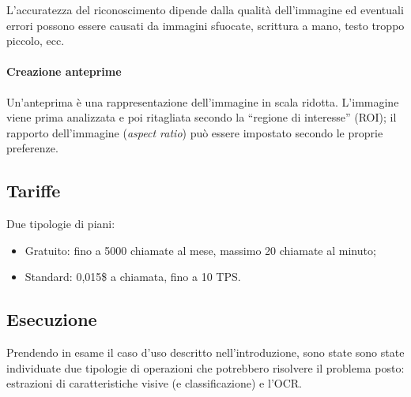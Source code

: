 \documentclass[fleqn,a4paper,11pt]{report}
\begin{document}
L'accuratezza del riconoscimento dipende dalla qualità dell'immagine ed eventuali errori possono essere causati da immagini sfuocate, scrittura a mano, testo troppo piccolo, ecc.
   
\paragraph{Creazione anteprime} Un'anteprima è una rappresentazione dell'immagine in scala ridotta. L'immagine viene prima analizzata e poi ritagliata secondo la ``regione di interesse'' (ROI); il rapporto dell'immagine (\textit{aspect ratio}) può essere impostato secondo le proprie preferenze.

\subsection{Tariffe} Due tipologie di piani:
\begin{itemize}
\item Gratuito: fino a 5000 chiamate al mese, massimo 20 chiamate al minuto;
\item Standard: 0,015\$ a chiamata, fino a 10 TPS.
\end{itemize}

\subsection{Esecuzione}
Prendendo in esame il caso d'uso descritto nell'introduzione, sono state sono state individuate due tipologie di operazioni che potrebbero risolvere il problema posto: estrazioni di caratteristiche visive (e classificazione) e l'OCR.
\end{document}
